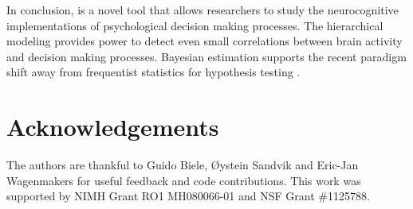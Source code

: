\documentclass[letterpaper,10pt,english]{article}
\begin{document}
In conclusion,  is a novel tool that allows researchers to study the neurocognitive implementations of psychological decision making processes. The hierarchical modeling provides power to detect even small correlations between brain activity and decision making processes. Bayesian estimation supports the recent paradigm shift away from frequentist statistics for hypothesis testing \citep{Lindley65,Kruschke10,LeeWagenmakers13}.

\section*{Acknowledgements}
The authors are thankful to Guido Biele, Øystein Sandvik and Eric-Jan Wagenmakers for useful feedback and code contributions. This work was supported by NIMH Grant RO1 MH080066-01 and NSF Grant \#1125788.




\renewcommand{\indexname}{Index}
\printindex
\end{document}
